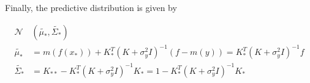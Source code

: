 \documentclass[12pt]{article}
\begin{document}
Finally, the predictive distribution is given by

\begin{equation}
 \begin{align}
  \mathcal{N}&(\widetilde{\mu_*}, \widetilde{\Sigma_*}) \\
  \widetilde{\mu_*} &= m(f(x_*)) + K_*^T(K + \sigma_y^2I)^{-1}(f - m(y)) = K_*^T(K + \sigma_y^2I)^{-1}f\\
  \widetilde{\Sigma_*} &= K_{**} - K_*^T(K + \sigma_y^2I)^{-1}K_* = 1 - K_*^T(K + \sigma_y^2I)^{-1}K_*
 \end{align}
\end{equation}
\end{document}
